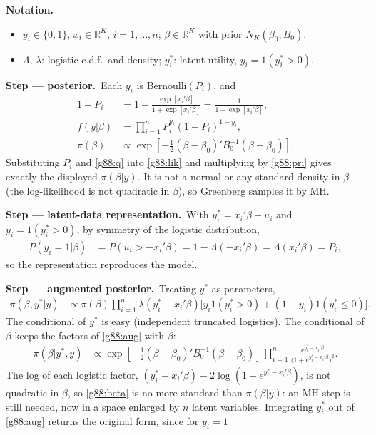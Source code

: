 \documentclass[11pt,a4paper]{article}
\newenvironment{notacao}{\par\smallskip\noindent\textbf{Notation.}\begin{itemize}[leftmargin=1.4em,topsep=1pt,itemsep=0pt]\small}{\end{itemize}}
\newcommand{\passo}[2]{\par\smallskip\noindent\textbf{Step --- #1.}~#2}
\begin{document}
\begin{sol}
\begin{notacao}
\item $y_i\in\{0,1\}$, $x_i\in\mathbb R^K$, $i=1,\ldots,n$; $\beta\in\mathbb R^K$ with prior $N_K(\beta_0,B_0)$.
\item $\Lambda$, $\lambda$: logistic c.d.f.\ and density; $y_i^*$: latent utility, $y_i=1(y_i^*>0)$.
\end{notacao}
\passo{posterior}{Each $y_i$ is Bernoulli$(P_i)$, and
\begin{align}
1-P_i&=1-\frac{\exp[x_i'\beta]}{1+\exp[x_i'\beta]}=\frac{1}{1+\exp[x_i'\beta]},\label{g88:q}\\
f(y|\beta)&=\prod_{i=1}^nP_i^{y_i}(1-P_i)^{1-y_i},\label{g88:lik}\\
\pi(\beta)&\propto\exp\left[-\tfrac12(\beta-\beta_0)'B_0^{-1}(\beta-\beta_0)\right].\label{g88:pri}
\end{align}
Substituting $P_i$ and \eqref{g88:q} into \eqref{g88:lik} and multiplying by \eqref{g88:pri} gives exactly the displayed $\pi(\beta|y)$. It is not a normal or any standard density in $\beta$ (the log-likelihood is not quadratic in $\beta$), so Greenberg samples it by MH.}
\passo{latent-data representation}{With $y_i^*=x_i'\beta+u_i$ and $y_i=1(y_i^*>0)$, by symmetry of the logistic distribution,
\begin{align}
P(y_i=1|\beta)&=P(u_i>-x_i'\beta)=1-\Lambda(-x_i'\beta)=\Lambda(x_i'\beta)=P_i,\label{g88:sym}
\end{align}
so the representation reproduces the model.}
\passo{augmented posterior}{Treating $y^*$ as parameters,
\begin{align}
\pi(\beta,y^*|y)&\propto\pi(\beta)\prod_{i=1}^n\lambda(y_i^*-x_i'\beta)\big[y_i1(y_i^*>0)+(1-y_i)1(y_i^*\le0)\big].\label{g88:aug}
\end{align}
The conditional of $y^*$ is easy (independent truncated logistics). The conditional of $\beta$ keeps the factors of \eqref{g88:aug} with $\beta$:
\begin{align}
\pi(\beta|y^*,y)&\propto\exp\left[-\tfrac12(\beta-\beta_0)'B_0^{-1}(\beta-\beta_0)\right]\prod_{i=1}^n\frac{e^{y_i^*-x_i'\beta}}{\big(1+e^{y_i^*-x_i'\beta}\big)^2}.\label{g88:beta}
\end{align}
The log of each logistic factor, $(y_i^*-x_i'\beta)-2\log(1+e^{y_i^*-x_i'\beta})$, is not quadratic in $\beta$, so \eqref{g88:beta} is no more standard than $\pi(\beta|y)$: an MH step is still needed, now in a space enlarged by $n$ latent variables. Integrating $y_i^*$ out of \eqref{g88:aug} returns the original form, since for $y_i=1$
}
\end{sol}
\end{document}
